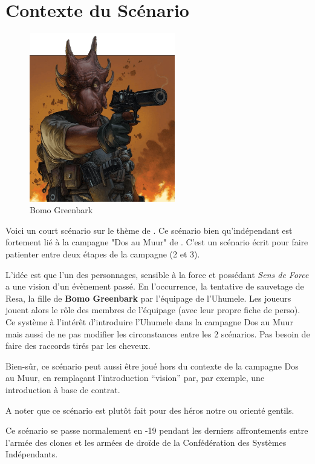 \documentclass{jdrp}
\begin{document}
	\section{Contexte du Scénario}
		\begin{figure}
			\centering
			\includegraphics[width=180pt]{_img/songes-de-l-uhumele/bomo-greenbark.png}
			\caption{\label{fig:bomo-greenbark}Bomo Greenbark}
		\end{figure}

	Voici un court scénario sur le thème de . Ce scénario bien qu’indépendant est fortement lié à la campagne "Dos au Muur" de . C’est un scénario écrit pour faire patienter entre deux étapes de la campagne (2 et 3). 

	L’idée est que l’un des personnages, sensible à la force et possédant \textit{Sens de Force} a une vision d’un évènement passé. En l’occurrence, la tentative de sauvetage de Resa, la fille de \textbf{Bomo Greenbark} par l'équipage de l’Uhumele. Les joueurs jouent alors le rôle des membres de l’équipage (avec leur propre fiche de perso). Ce système à l’intérêt d’introduire l’Uhumele dans la campagne Dos au Muur mais aussi de ne pas modifier les circonstances entre les 2 scénarios. Pas besoin de faire des raccords tirés par les cheveux.

	Bien-sûr, ce scénario peut aussi être joué hors du contexte de la campagne Dos au Muur, en remplaçant l’introduction “vision” par, par exemple, une introduction à base de contrat.

	A noter que ce scénario est plutôt fait pour des héros notre ou orienté gentils.

	Ce scénario se passe normalement en -19 pendant les derniers affrontements entre l’armée des clones et les armées de droïde de la Confédération des Systèmes Indépendants.
\end{document}
